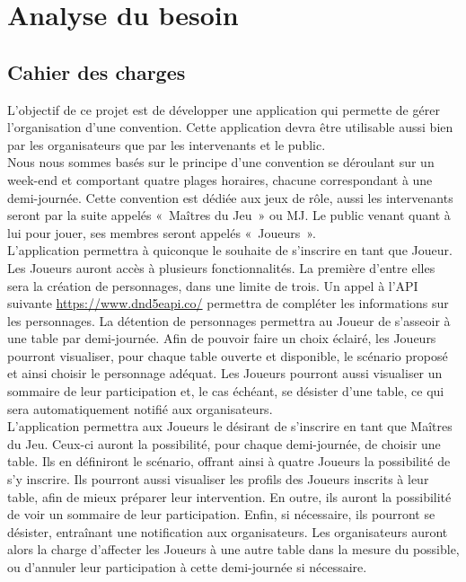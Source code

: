 \documentclass[11pt]{article}
\begin{document}
\newpage


\section{Analyse du besoin}

\subsection{Cahier des charges}

L'objectif de ce projet est de développer une application qui permette de gérer l'organisation d'une convention. Cette application devra être utilisable aussi bien par les organisateurs que par les intervenants et le public.  \\

Nous nous sommes basés sur le principe d'une convention se déroulant sur un week-end et comportant quatre plages horaires, chacune correspondant à une demi-journée. Cette convention est dédiée aux jeux de rôle, aussi les intervenants seront par la suite appelés «~Maîtres du Jeu~» ou MJ. Le public venant quant à lui pour jouer, ses membres seront appelés «~Joueurs~».\\ 

L'application permettra à quiconque le souhaite de s'inscrire en tant que Joueur. Les Joueurs auront accès à plusieurs fonctionnalités. La première d'entre elles sera la création de personnages, dans une limite de trois. Un appel à l'API suivante \textcolor{blue}{\href{https://www.dnd5eapi.co/}{https://www.dnd5eapi.co/}} permettra de compléter les informations sur les personnages. La détention de personnages permettra au Joueur de s'asseoir à une table par demi-journée. Afin de pouvoir faire un choix éclairé, les Joueurs pourront visualiser, pour chaque table ouverte et disponible, le scénario proposé et ainsi choisir le personnage adéquat. Les Joueurs pourront aussi visualiser un sommaire de leur participation et, le cas échéant, se désister d'une table, ce qui sera automatiquement notifié aux organisateurs.\\

L'application permettra aux Joueurs le désirant de s'inscrire en tant que Maîtres du Jeu. Ceux-ci auront la possibilité, pour chaque demi-journée, de choisir une table.  Ils en définiront le scénario, offrant ainsi à quatre Joueurs la possibilité de s'y inscrire. Ils pourront aussi visualiser les profils des Joueurs inscrits à leur table, afin de mieux préparer leur intervention. En outre, ils auront la possibilité de voir un sommaire de leur participation. Enfin, si nécessaire, ils pourront se désister, entraînant une notification aux organisateurs. Les organisateurs auront alors la charge d'affecter les Joueurs à une autre table dans la mesure du possible, ou d'annuler leur participation à cette demi-journée si nécessaire.\\
\end{document}

